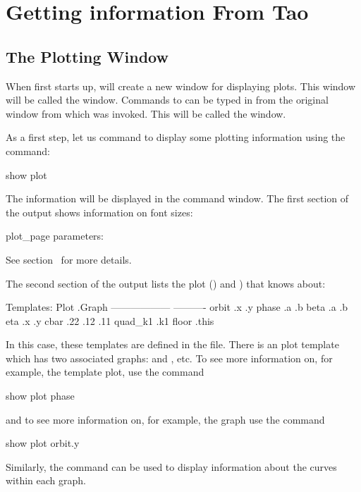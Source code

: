 \chapter{Getting information From Tao}
\label{c:get.info}

\section{The Plotting Window}

When \tao first starts up, \tao will create a new window for
displaying plots. This window will be called the 
window. Commands to \tao can be typed in from the original window from
which \tao was invoked. This will be called the  window.

As a first step, let us command \tao to display some plotting
information using the command:
\begin{example}
  show plot
\end{example}
The information will be displayed in the command window. The first
section of the  output shows information on font sizes:
\begin{example}
  plot_page parameters:
\end{example}
See section~ for more details. 

The second section of the  output
lists the plot  () and
) that \tao knows about:
\begin{example}
 Templates:
   Plot                .Graph
   ------------------  ----------
   orbit               .x  .y
   phase               .a  .b
   beta                .a  .b
   eta                 .x  .y
   cbar                .22  .12  .11
   quad_k1             .k1
   floor               .this
\end{example}
In this case, these templates are defined in the 
file. There is an  plot template which has two associated
graphs:  and , etc. To see more information on, for example,
the  template plot, use the command
\begin{example}
  show plot phase
\end{example}
and to see more information on, for example, the  graph use the command
\begin{example}
  show plot orbit.y
\end{example}
Similarly, the  command can be used to display
information about the curves within each graph.

